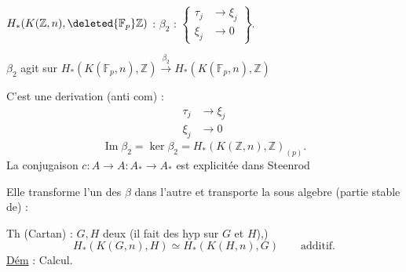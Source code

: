 $H_*(K(\mathbb Z,n),\deleted{\mathbb F_p}\mathbb Z)$ : $\beta_2$ :
$\left\{\begin{aligned}\tau_j&\longrightarrow\xi_j\\ \xi_j&\longrightarrow0\end{aligned}\right\}$.

$\beta_2$ agit sur $H_*(K(\mathbb F_p,n),\mathbb Z)\xrightarrow{\beta_2}H_*(K(\mathbb F_p,n),\mathbb Z)$

C'est une derivation (anti com) :
\[
\begin{aligned}\tau_j&\longrightarrow\xi_j\\ \xi_j&\longrightarrow0\end{aligned}
\]
\[
\operatorname{Im}\beta_2=\ker\beta_2=H_*(K(\mathbb Z,n),\mathbb Z)_{(p)} .
\]
La conjugaison $c:A\longrightarrow A$\quad $:A_*\longrightarrow A_*$ est explicitée dans Steenrod

Elle transforme l'un des $\beta$ dans l'autre et transporte la sous algebre (partie stable de) :


Th (Cartan) : $G,H$ deux   (il fait des hyp sur $G$ et $H$),)
\[
H_*(K(G,n),H)\simeq H_*(K(H,n),G)\qquad\text{additif.}
\]
\uline{Dém} : Calcul.

